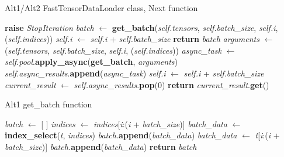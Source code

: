\documentclass[pdfa%
,cucitura%
]{toptesi}
\begin{document}
\begin{algorithm}[h!]
	\caption{Alt1/Alt2 FastTensorDataLoader class, Next function}\label{alg:Alt1_2FastDataLoaderNext}
	\begin{algorithmic}[1]
		\State \textbf{raise} \textit{StopIteration}
		\EndIf
		\EndIf
		\State
		\State \textit{batch} $\gets$ \textbf{get\_batch}(\textit{self.tensors}, \textit{self.batch\_size}, \textit{self.i}, (\textit{self.indices}))
		\State \textit{self.i} $\gets$ \textit{self.i} + \textit{self.batch\_size}
		\State \textbf{return} \textit{batch}
		\Else
		\State \textit{arguments} $\gets$ (\textit{self.tensors}, \textit{self.batch\_size}, \textit{self.i}, (\textit{self.indices}))
		\State \textit{async\_task} $\gets$ \textit{self.pool}.\textbf{apply\_async}(\textbf{get\_batch}, \textit{arguments})
		\State \textit{self.async\_results}.\textbf{append}(\textit{async\_task})
		\State \textit{self.i} $\gets$ \textit{self.i} + \textit{self.batch\_size}
		\EndWhile
		\State
		\State \textit{current\_result} $\gets$ \textit{self.async\_results}.\textbf{pop}(0)
		\State \textbf{return} \textit{current\_result}.\textbf{get}()
		\EndIf
		\EndFunction
	\end{algorithmic}
\end{algorithm}

\begin{algorithm}[h!]
	\caption{Alt1 get\_batch function}\label{alg:Alt1GetBatch}
	\begin{algorithmic}[1]
		\State \textit{batch} $\gets$ [ ]
		\State \textit{indices} $\gets$ \textit{indices}[\textit{i}:(\textit{i} + \textit{batch\_size})]
		\State
		\State \textit{batch\_data} $\gets$ \textbf{index\_select}(\textit{t}, \textit{indices})
		\State \textit{batch.}\textbf{append}(\textit{batch\_data})
		\EndFor
		\Else
		\State \textit{batch\_data} $\gets$ \textit{t}[\textit{i}:(\textit{i} + \textit{batch\_size})]
		\State \textit{batch.}\textbf{append}(\textit{batch\_data})
		\EndFor
		\EndIf
		\State
		\State \textbf{return} \textit{batch}
		\EndFunction
	\end{algorithmic}
\end{algorithm}
\end{document}
